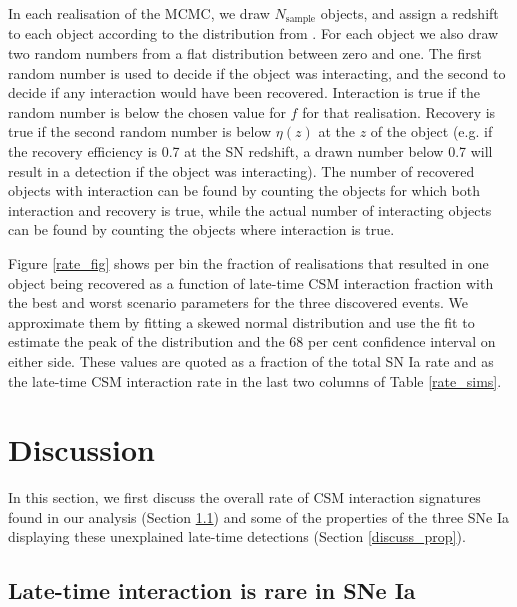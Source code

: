 \documentclass[a4paper,oneside,12pt, class=Latex/Classes/PhDthesisPSnPDF, crop=false]{standalone}
\begin{document}
In each realisation of the MCMC, we draw $N_\text{sample}$ objects, and assign a redshift to each object according to the distribution from \citet{SNIa_rate}. For each object we also draw two random numbers from a flat distribution between zero and one. The first random number is used to decide if the object was interacting, and the second to decide if any interaction would have been recovered. Interaction is true if the random number is below the chosen value for $f$ for that realisation. Recovery is true if the second random number is below $\eta(z)$ at the $z$ of the object (e.g. if the recovery efficiency is 0.7 at the SN redshift, a drawn number below 0.7 will result in a detection if the object was interacting). The number of recovered objects with interaction can be found by counting the objects for which both interaction and recovery is true, while the actual number of interacting objects can be found by counting the objects where interaction is true.

Figure \ref{rate_fig} shows per bin the fraction of realisations that resulted in one object being recovered as a function of late-time CSM interaction fraction with the best and worst scenario parameters for the three discovered events. We approximate them by fitting a skewed normal distribution and use the fit to estimate the peak of the distribution and the 68 per cent confidence interval on either side. These values are quoted as a fraction of the total SN Ia rate and as the late-time CSM interaction rate in the last two columns of Table \ref{rate_sims}.


\section{Discussion}
\label{discussion}

In this section, we first discuss the overall rate of CSM interaction signatures found in our analysis (Section \ref{discuss_interaction}) and some of the properties of the three SNe Ia displaying these unexplained late-time detections (Section \ref{discuss_prop}). 

\subsection{Late-time interaction is rare in SNe Ia}
\label{discuss_interaction}
\end{document}
